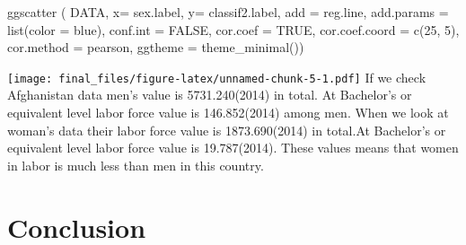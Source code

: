 \documentclass[
  12pt,
]{article}
\newenvironment{Shaded}{\begin{snugshade}}{\end{snugshade}}
\newcommand{\AttributeTok}[1]{\textcolor[rgb]{0.77,0.63,0.00}{#1}}
\newcommand{\ConstantTok}[1]{\textcolor[rgb]{0.00,0.00,0.00}{#1}}
\newcommand{\DecValTok}[1]{\textcolor[rgb]{0.00,0.00,0.81}{#1}}
\newcommand{\FunctionTok}[1]{\textcolor[rgb]{0.00,0.00,0.00}{#1}}
\newcommand{\NormalTok}[1]{#1}
\newcommand{\StringTok}[1]{\textcolor[rgb]{0.31,0.60,0.02}{#1}}
\begin{document}
\begin{Shaded}
\begin{Highlighting}[]
  \FunctionTok{ggscatter}\NormalTok{ ( DATA,}
             \AttributeTok{x=} \StringTok{\textquotesingle{}sex.label\textquotesingle{}}\NormalTok{,}
             \AttributeTok{y=} \StringTok{\textquotesingle{}classif2.label\textquotesingle{}}\NormalTok{,}
             \AttributeTok{add =} \StringTok{\textquotesingle{}reg.line\textquotesingle{}}\NormalTok{,}
             \AttributeTok{add.params =} \FunctionTok{list}\NormalTok{(}\AttributeTok{color =} \StringTok{\textquotesingle{}blue\textquotesingle{}}\NormalTok{),}
             \AttributeTok{conf.int =} \ConstantTok{FALSE}\NormalTok{,}
             \AttributeTok{cor.coef =} \ConstantTok{TRUE}\NormalTok{,}
             \AttributeTok{cor.coef.coord =} \FunctionTok{c}\NormalTok{(}\DecValTok{25}\NormalTok{, }\DecValTok{5}\NormalTok{),}
             \AttributeTok{cor.method =} \StringTok{\textquotesingle{}pearson\textquotesingle{}}\NormalTok{,}
             \AttributeTok{ggtheme =} \FunctionTok{theme\_minimal}\NormalTok{())}
\end{Highlighting}
\end{Shaded}

\texttt{[image: final\_files/figure-latex/unnamed-chunk-5-1.pdf]}
If we check Afghanistan data men's value is 5731.240(2014) in total. At Bachelor's or equivalent level labor force value is 146.852(2014) among men. When we look at woman's data their labor force value is 1873.690(2014) in total.At Bachelor's or equivalent level labor force value is 19.787(2014). These values means that women in labor is much less than men in this country.

\hypertarget{conclusion}{%
\section{Conclusion}\label{conclusion}}
\end{document}
